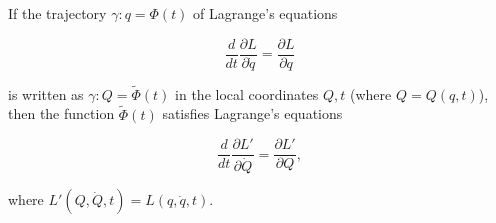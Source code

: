 If the trajectory $\gamma: q = \Phi(t)$ of Lagrange's equations

$$\frac{d}{dt}\frac{\partial L}{\partial \dot{q}} = \frac{\partial L}{\partial q}$$

is written as $\gamma: Q = \tilde{\Phi}(t)$ in the local coordinates $Q, t$ (where $Q = Q(q, t)$), then the function $\tilde{\Phi}(t)$ satisfies Lagrange's equations

$$\frac{d}{dt}\frac{\partial L'}{\partial \dot{Q}} = \frac{\partial L'}{\partial Q},$$

where $L'(Q, \dot{Q}, t) = L(q, \dot{q}, t)$.
